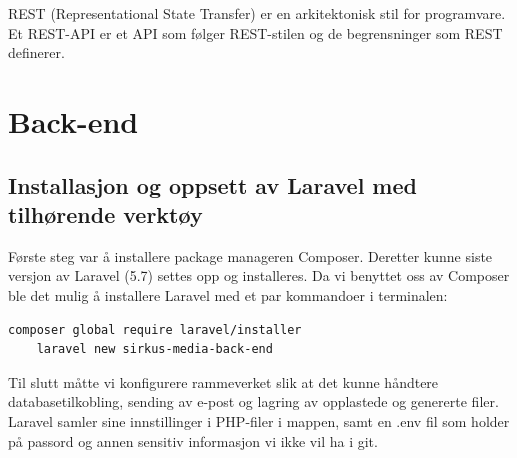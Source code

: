 REST (Representational State Transfer) er en arkitektonisk stil for programvare. Et REST-API \cite{Masse2011radr} er et API som følger REST-stilen og de begrensninger som REST definerer.





\section{Back-end}
\subsection{Installasjon og oppsett av Laravel med tilhørende verktøy}
Første steg var å installere package manageren Composer. Deretter kunne siste versjon av Laravel (5.7) settes opp og installeres. Da vi benyttet oss av Composer ble det mulig å installere Laravel med et par kommandoer i terminalen:
\begin{lstlisting}[caption={Installasjon av Laravel med Composer},language=bash]
    composer global require laravel/installer
    laravel new sirkus-media-back-end
\end{lstlisting}

Til slutt måtte vi konfigurere rammeverket slik at det kunne håndtere databasetilkobling, sending av e-post og lagring av opplastede og genererte filer. Laravel samler sine innstillinger i PHP-filer i  mappen, samt en .env fil som holder på passord og annen sensitiv informasjon vi ikke vil ha i git.


